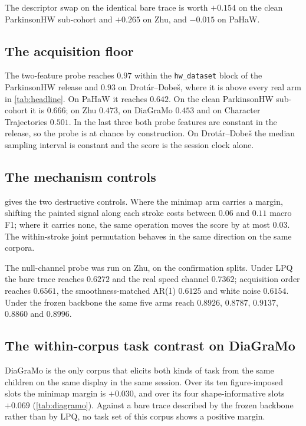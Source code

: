 The descriptor swap on the identical bare trace is worth $+0.154$ on the clean ParkinsonHW
sub-cohort and $+0.265$ on Zhu, and $-0.015$ on PaHaW.




\subsection{The acquisition floor}
\label{sec:results-floor}

The two-feature probe reaches $0.97$ within the \texttt{hw\_dataset} block of the ParkinsonHW
release and $0.93$ on Drot\'ar--Dobe\v{s}, where it is above every real arm in \cref{tab:headline}.
On PaHaW it reaches $0.642$. On the clean ParkinsonHW sub-cohort it is $0.666$; on Zhu $0.473$, on
DiaGraMo $0.453$ and on Character Trajectories $0.501$. In the last three both probe features are
constant in the release, so the probe is at chance by construction. On Drot\'ar--Dobe\v{s} the
median sampling interval is constant and the score is the session clock alone.

\subsection{The mechanism controls}
\label{sec:results-controls}

 gives the two destructive controls. Where the minimap arm carries a margin,
shifting the painted signal along each stroke costs between $0.06$ and $0.11$ macro F1; where it
carries none, the same operation moves the score by at most $0.03$. The within-stroke joint
permutation behaves in the same direction on the same corpora.

The null-channel probe was run on Zhu, on the confirmation splits. Under LPQ the bare trace reaches
$0.6272$ and the real speed channel $0.7362$; acquisition order reaches $0.6561$, the
smoothness-matched AR(1) $0.6125$ and white noise $0.6154$. Under the frozen backbone the same five
arms reach $0.8926$, $0.8787$, $0.9137$, $0.8860$ and $0.8996$.



\subsection{The within-corpus task contrast on DiaGraMo}
\label{sec:results-diagramo}

DiaGraMo is the only corpus that elicits both kinds of task from the same children on the same
display in the same session. Over its ten figure-imposed slots the minimap margin is $+0.030$, and
over its four shape-informative slots $+0.069$ (\cref{tab:diagramo}). Against a bare trace
described by the frozen backbone rather than by LPQ, no task set of this corpus shows a positive
margin.

